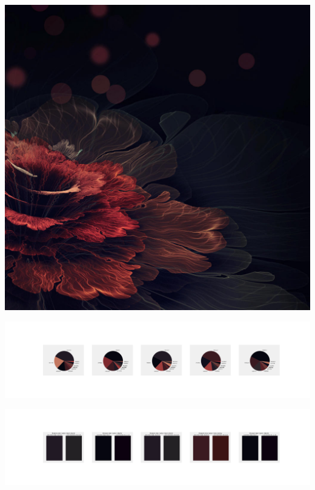 \documentclass[11pt]{article}
\begin{document}
\begin{landscape}
    \begin{center}
    \includegraphics[width=\textwidth]{./nbimg/file (107).jpg}
    \end{center}

    \begin{center}
    \includegraphics[width=250mm]{./nbimg/pie-9.jpg}
    \end{center}

    \begin{center}
    \includegraphics[width=250mm]{./nbimg/peak-9.jpg}
    \end{center}
    


\end{landscape}
\end{document}
